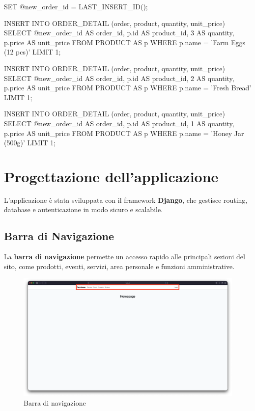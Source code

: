 \documentclass[a4paper,12pt]{report}
\begin{document}
\begin{sqlcode}[caption={}]
SET @new_order_id = LAST_INSERT_ID();

INSERT INTO ORDER_DETAIL (order, product, quantity, unit_price)
SELECT
  @new_order_id AS order_id,
  p.id AS product_id,
  3 AS quantity,
  p.price AS unit_price
FROM PRODUCT AS p
WHERE p.name = 'Farm Eggs (12 pcs)'
LIMIT 1;

INSERT INTO ORDER_DETAIL (order, product, quantity, unit_price)
SELECT
  @new_order_id AS order_id,
  p.id AS product_id,
  2 AS quantity,
  p.price AS unit_price
FROM PRODUCT AS p
WHERE p.name = 'Fresh Bread'
LIMIT 1;

INSERT INTO ORDER_DETAIL (order, product, quantity, unit_price)
SELECT
  @new_order_id AS order_id,
  p.id AS product_id,
  1 AS quantity,
  p.price AS unit_price
FROM PRODUCT AS p
WHERE p.name = 'Honey Jar (500g)'
LIMIT 1;
\end{sqlcode}

\chapter{Progettazione dell'applicazione}
L'applicazione è stata sviluppata con il framework \textbf{Django},
che gestisce routing,
database e autenticazione in modo sicuro e scalabile.

\section{Barra di Navigazione}
La \textbf{barra di navigazione} permette un accesso rapido alle
principali sezioni del sito,
come prodotti, eventi, servizi, area personale e funzioni amministrative.

\begin{figure}[H]
  \centering
  \includegraphics[width=\textwidth, trim=0 0 0 0]{./img/navbar.png}
  \caption{Barra di navigazione}
  \label{fig:navbar}
\end{figure}
\end{document}
